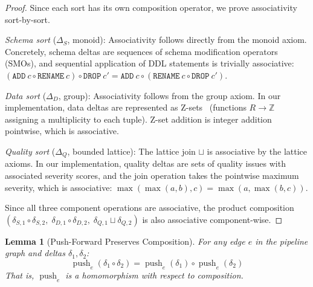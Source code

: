 \documentclass[sigplan,screen,nonacm]{acmart}
\newcommand{\DeltaS}{\Delta_{\!S}}
\newcommand{\DeltaD}{\Delta_{\!D}}
\newcommand{\DeltaQ}{\Delta_{\!Q}}
\newcommand{\compose}{\mathbin{\circ}}
\newcommand{\push}{\operatorname{push}}
\newtheorem{lemma}[theorem]{Lemma}
\begin{document}
\begin{proof}
Since each sort has its own composition operator, we prove associativity
sort-by-sort.

\emph{Schema sort} ($\DeltaS$, monoid):  Associativity follows directly
from the monoid axiom.  Concretely, schema deltas are sequences of
schema modification operators (SMOs), and sequential application of DDL
statements is trivially associative:
$(\texttt{ADD}~c \compose \texttt{RENAME}~c) \compose \texttt{DROP}~c'
= \texttt{ADD}~c \compose (\texttt{RENAME}~c \compose \texttt{DROP}~c')$.

\emph{Data sort} ($\DeltaD$, group):  Associativity follows from the
group axiom.  In our implementation, data deltas are represented as
Z-sets~\cite{budiu2023dbsp} (functions $R \to \mathbb{Z}$ assigning a
multiplicity to each tuple).  Z-set addition is integer addition
pointwise, which is associative.

\emph{Quality sort} ($\DeltaQ$, bounded lattice):  The lattice join
$\sqcup$ is associative by the lattice axioms.  In our implementation,
quality deltas are sets of quality issues with associated severity
scores, and the join operation takes the pointwise maximum severity,
which is associative: $\max(\max(a,b),c) = \max(a,\max(b,c))$.

Since all three component operations are associative, the product
composition $(\delta_{S,1} \compose \delta_{S,2},\; \delta_{D,1} \compose
\delta_{D,2},\; \delta_{Q,1} \sqcup \delta_{Q,2})$ is also associative
component-wise.
\end{proof}

\begin{lemma}[Push-Forward Preserves Composition]\label{lem:push-compose}
For any edge $e$ in the pipeline graph and deltas $\delta_1, \delta_2$:
\[
  \push_e(\delta_1 \compose \delta_2) = \push_e(\delta_1) \compose \push_e(\delta_2)
\]
That is, $\push_e$ is a homomorphism with respect to composition.
\end{lemma}
\end{document}

